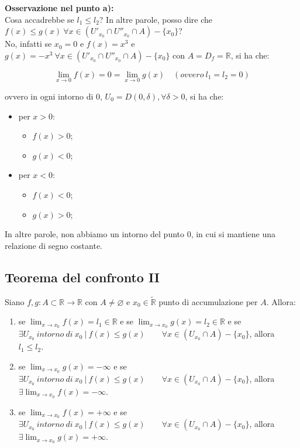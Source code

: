 \documentclass{article}
\begin{document}
\noindent\textbf{Osservazione nel punto a):} \\
\noindent Cosa accadrebbe se $l_1 \leq l_2$? In altre parole, posso dire che $f(x) \leq g(x) \ \forall x \in (U'_{x_0} \cap U''_{x_0} \cap A) - \{x_0\}$? \\
No, infatti se $x_0 = 0$ e $f(x) = x^3$ e $g(x) = -x^3 \ \forall x \in (U'_{x_0} \cap U''_{x_0} \cap A) - \{x_0\}$ con $A = D_f = \mathbb{R}$, si ha che:

\begin{equation*}
    \lim_{x \to 0} f(x) = 0 = \lim_{x \to 0} g(x) \quad (ovvero \ l_1 = l_2 = 0)
\end{equation*}

\noindent ovvero in ogni intorno di $0$, $U_0 = D(0, \delta), \forall \delta > 0$, si ha che:

\begin{itemize}
    \item per $x > 0$:
    \begin{itemize}
        \item $f(x) > 0$;
        \item $g(x) < 0$;
    \end{itemize}
    \item per $x < 0$:
    \begin{itemize}
        \item $f(x) < 0$;
        \item $g(x) > 0$;
    \end{itemize}
\end{itemize}

\noindent In altre parole, non abbiamo un intorno del punto $0$, in cui si mantiene una relazione di segno costante.

\subsection{Teorema del confronto II}
Siano $f, g: A \subset \mathbb{R} \xrightarrow{} \mathbb{R}$ con $A \neq \varnothing$ e $x_0 \in \widetilde{\mathbb{R}}$ punto di accumulazione per $A$. Allora:

\begin{enumerate}[label=\alph{enumi})]
    \item se $\lim_{x \to x_0} f(x) = l_1 \in \mathbb{R}$ e se $\lim_{x \to x_0} g(x) = l_2 \in \mathbb{R}$ e se $\exists U_{x_0} \ intorno \ di \ x_0 \ | \ f(x) \leq g(x) \qquad \forall x \in (U_{x_0} \cap A) - \{x_0\}$, allora $l_1 \leq l_2$.
    \item se $\lim_{x \to x_0} g(x) = -\infty$ e se $\exists U_{x_0} \ intorno \ di \ x_0 \ | \ f(x) \leq g(x) \qquad \forall x \in (U_{x_0} \cap A) - \{x_0\}$, allora $\exists \lim_{x \to x_0} f(x) = - \infty$.
     \item se $\lim_{x \to x_0} f(x) = +\infty$ e se $\exists U_{x_0} \ intorno \ di \ x_0 \ | \ f(x) \leq g(x) \qquad \forall x \in (U_{x_0} \cap A) - \{x_0\}$, allora $\exists \lim_{x \to x_0} g(x) = + \infty$.
\end{enumerate}
\end{document}
